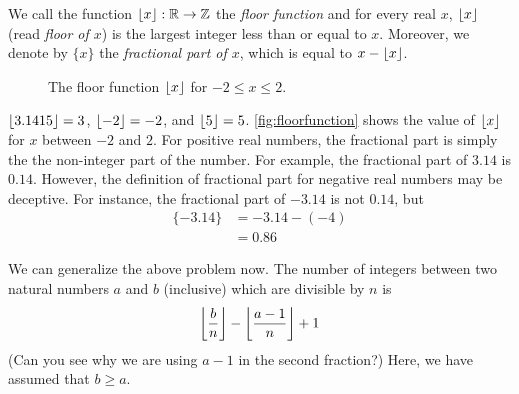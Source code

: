 \begin{definition}
We call the function $\left\lfloor{x}\right\rfloor: \mathbb{R} \to \mathbb Z$ the \textit{floor function} and for every real $x$, $\left\lfloor{x}\right\rfloor$ (read \textit{floor of $x$}) is the largest integer less than or equal to $x$. Moreover, we denote by $\{x\}$ the \textit{fractional part of $x$}, which is equal to $x-\left\lfloor{x}\right\rfloor$.

\begin{figure}
	\centering
	\caption{The floor function $\left\lfloor{x}\right\rfloor$ for $-2 \leq x \leq 2$.}
	\label{fig:floorfunction}
\end{figure}

\end{definition}

\begin{example}
$\left\lfloor{3.1415}\right\rfloor=3$, $\left\lfloor{-2}\right\rfloor=-2$, and $\left\lfloor{5}\right\rfloor=5$. \autoref{fig:floorfunction} shows the value of $\left\lfloor{x}\right\rfloor$ for $x$ between $-2$ and $2$. For positive real numbers, the fractional part is simply the the non-integer part of the number. For example, the fractional part of  $3.14$ is $0.14$. However, the definition of fractional part for negative real numbers may be deceptive. For instance, the fractional part of $-3.14$ is not $0.14$, but
\begin{align*}
	\{-3.14\} &= -3.14 - (-4)\\
	&= 0.86
\end{align*}
\end{example}

We can generalize the above problem now. The number of integers between two natural numbers $a$ and $b$ (inclusive) which are divisible by $n$ is
\begin{align*}
\left\lfloor{\dfrac{b}{n}}\right\rfloor-\left\lfloor{\dfrac{a-1}{n}}\right\rfloor+1
\end{align*}
(Can you see why we are using $a-1$ in the second fraction?) Here, we have assumed that $b\geq a$.

